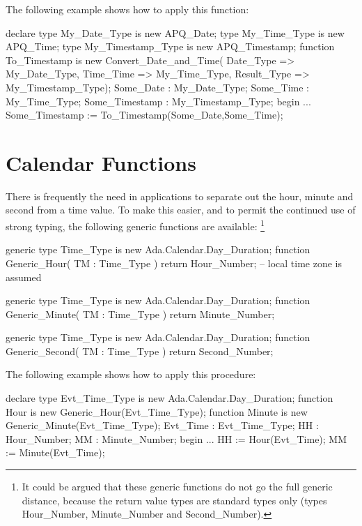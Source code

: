 \documentclass[english,letterpaper]{book}
\begin{document}
The following example shows how to apply this function:

\begin{Example}
declare
   type My_Date_Type is new APQ_Date;
   type My_Time_Type is new APQ_Time; 
   type My_Timestamp_Type is new APQ_Timestamp;
   function To_Timestamp is new 
      Convert_Date_and_Time(
         Date_Type => My_Date_Type,
         Time_Time => My_Time_Type,
         Result_Type => My_Timestamp_Type);
   Some_Date :      My_Date_Type;
   Some_Time :      My_Time_Type;
   Some_Timestamp : My_Timestamp_Type;
begin
   ...
   Some_Timestamp := To_Timestamp(Some_Date,Some_Time);
\end{Example}


\chapter{Calendar Functions}

There is frequently the need in applications to separate out the hour,
minute and second from a time
value. To make this easier, and to permit the continued use of strong
typing, the following generic functions are available:%
\footnote{It could be argued that these generic functions do not go the full
generic distance, because the return value types are standard types
only (types Hour\_Number, Minute\_Number and Second\_Number).%
}

\begin{Code}
generic
   type Time_Type is new Ada.Calendar.Day_Duration;
function Generic_Hour(
   TM : Time_Type
) return Hour_Number;
-- local time zone is assumed
\end{Code}

\begin{Code}
generic
   type Time_Type is new Ada.Calendar.Day_Duration;
function Generic_Minute(
   TM : Time_Type
) return Minute_Number;
\end{Code}

\begin{Code}
generic
   type Time_Type is new Ada.Calendar.Day_Duration;
function Generic_Second(
   TM : Time_Type
) return Second_Number;
\end{Code}

The following example shows how to apply this procedure:

\begin{Example}
declare
   type Evt_Time_Type is new Ada.Calendar.Day_Duration;
   function Hour is new Generic_Hour(Evt_Time_Type); 
   function Minute is new Generic_Minute(Evt_Time_Type);
   Evt_Time : Evt_Time_Type;
   HH :       Hour_Number;
   MM :       Minute_Number;
begin
   ...
   HH := Hour(Evt_Time);
   MM := Minute(Evt_Time);
\end{Example}
\end{document}
